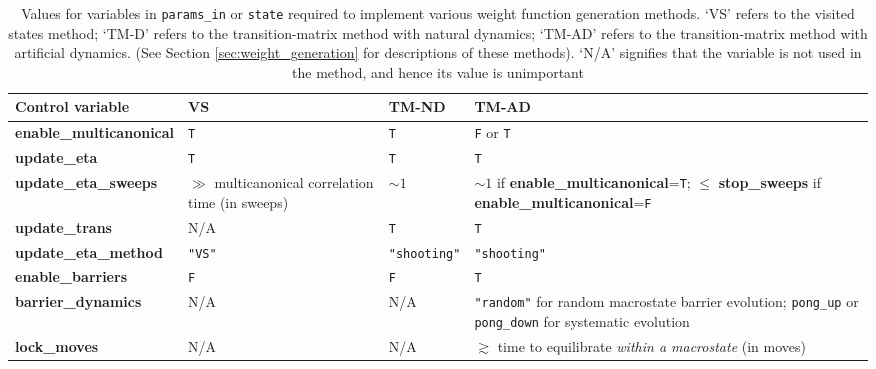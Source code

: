 \documentclass{report}
\begin{document}
\begin{landscape}
\begin{table}\label{table:wf_gen_variables}
\begin{center}
\begin{tabular}{l p{4cm} p{2cm} p{6cm}}
Control variable                   & VS                & TM-ND                & TM-AD \\
\hline 
\textbf{enable\_multicanonical}    & \texttt{T}        &   \texttt{T}         &  \texttt{F} or \texttt{T}   \\
\textbf{update\_eta}               & \texttt{T}        &   \texttt{T}         &  \texttt{T}                 \\
\textbf{update\_eta\_sweeps}       & $\gg$ multicanonical correlation time (in sweeps)  & $\sim 1$ &   $\sim 1$ if \textbf{enable\_multicanonical}=\texttt{T}; 
   $\leq$ \textbf{stop\_sweeps} if \textbf{enable\_multicanonical}=\texttt{F} \\
\textbf{update\_trans}             & N/A               &   \texttt{T}         &  \texttt{T}                 \\
\textbf{update\_eta\_method}       & \texttt{"VS"}       &   \texttt{"shooting"}  &  \texttt{"shooting"}     \\
\textbf{enable\_barriers}          & \texttt{F}        &   \texttt{F}         &  \texttt{T}                 \\
\textbf{barrier\_dynamics}         & N/A               &   N/A                &  \texttt{"random"} for random macrostate barrier evolution;
    \texttt{pong\_up} or \texttt{pong\_down} for systematic evolution  \\
\textbf{lock\_moves}               & N/A               &   N/A                &  $\gtrsim$ time to equilibrate \emph{within a macrostate} (in moves) \\
\end{tabular}
\end{center}
\caption{Values for variables in \texttt{params\_in} or \texttt{state} required to implement various weight function generation methods.
`VS' refers to the visited states method; `TM-D' refers to the transition-matrix method with natural dynamics; `TM-AD' refers to the
transition-matrix method with artificial dynamics. (See Section \ref{sec:weight_generation} for descriptions of these methods). `N/A' 
signifies that the variable is not used in the method, and hence its value is unimportant}
\end{table}
\end{landscape}
\end{document}
